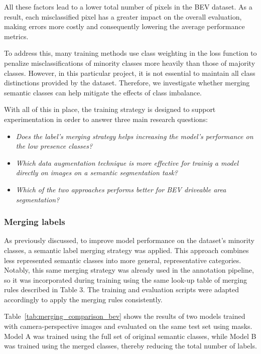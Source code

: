 All these factors lead to a lower total number of pixels in the BEV dataset. As a result, each misclassified pixel has a greater impact on the overall evaluation, making errors more costly and consequently lowering the average performance metrics.

To address this, many training methods use class weighting in the loss function to penalize misclassifications of minority classes more heavily than those of majority classes. However, in this particular project, it is not essential to maintain all class distinctions provided by the dataset. Therefore, we investigate whether merging semantic classes can help mitigate the effects of class imbalance.

With all of this in place, the training strategy is designed to support experimentation in order to answer three main research questions:

\begin{itemize}
    \item \textit{Does the label's merging strategy helps increasing the model's performance on the low presence classes?}
    \item \textit{Which data augmentation technique is more effective for trainig a model directly on  images on a semantic segmentation task?}
    \item \textit{Which of the two approaches performs better for BEV driveable area segmentation?}
\end{itemize}

\subsubsection{Merging labels} \label{sec:merging_labels}
As previously discussed, to improve model performance on the dataset's minority classes, a semantic label merging strategy was applied. This approach combines less represented semantic classes into more general, representative categories. Notably, this same merging strategy was already used in the annotation pipeline, so it was incorporated during training using the same look-up table of merging rules described in Table 3. The training and evaluation scripts were adapted accordingly to apply the merging rules consistently.

Table~\ref{tab:merging_comparison_bev} shows the results of two models trained with camera-perspective images and evaluated on the same test set using  masks. Model A was trained using the full set of original semantic classes, while Model B was trained using the merged classes, thereby reducing the total number of labels. 

